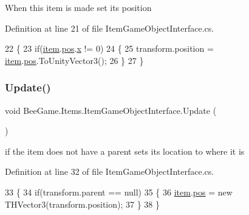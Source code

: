 When this item is made set its position 



Definition at line 21 of file Item\+Game\+Object\+Interface.\+cs.


\begin{DoxyCode}
22         \{
23             \textcolor{keywordflow}{if}(\hyperlink{class_bee_game_1_1_items_1_1_item_game_object_interface_abe9476a5393ff778bd99f684b24886ad}{item}.\hyperlink{struct_bee_game_1_1_items_1_1_item_a1343526a0c4c00b82b75513e7852e112}{pos}.\hyperlink{struct_bee_game_1_1_t_h_vector3_a3a414a33eefb779cc52428463f428b6d}{x} != 0)
24             \{
25                 transform.position = \hyperlink{class_bee_game_1_1_items_1_1_item_game_object_interface_abe9476a5393ff778bd99f684b24886ad}{item}.\hyperlink{struct_bee_game_1_1_items_1_1_item_a1343526a0c4c00b82b75513e7852e112}{pos}.ToUnityVector3();
26             \}
27         \}
\end{DoxyCode}
\mbox{\label{class_bee_game_1_1_items_1_1_item_game_object_interface_a33075cc11237c1f56022d1c380679f27}} 
\subsubsection{\texorpdfstring{Update()}{Update()}}
{\footnotesize\ttfamily void Bee\+Game.\+Items.\+Item\+Game\+Object\+Interface.\+Update (\begin{DoxyParamCaption}{ }\end{DoxyParamCaption})\hspace{0.3cm}{\ttfamily [private]}}



if the item does not have a parent sets it\textquotesingle{}s location to where it is 



Definition at line 32 of file Item\+Game\+Object\+Interface.\+cs.


\begin{DoxyCode}
33         \{
34             \textcolor{keywordflow}{if}(transform.parent == null)
35             \{
36                 \hyperlink{class_bee_game_1_1_items_1_1_item_game_object_interface_abe9476a5393ff778bd99f684b24886ad}{item}.\hyperlink{struct_bee_game_1_1_items_1_1_item_a1343526a0c4c00b82b75513e7852e112}{pos} = \textcolor{keyword}{new} THVector3(transform.position);
37             \}
38         \}
\end{DoxyCode}
\mbox{\label{class_bee_game_1_1_items_1_1_item_game_object_interface_aa88fbff044f2dceb7633b1b41175d085}} 
